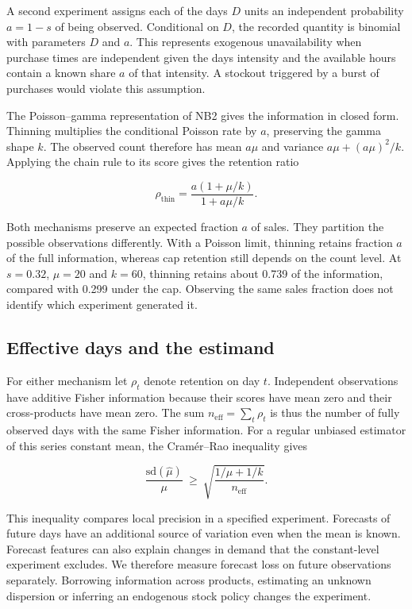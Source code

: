 \documentclass[11pt,a4paper]{article}
\begin{document}
A second experiment assigns each of the day\textquotesingle s \(D\) units an independent probability \(a=1-s\) of being observed. Conditional on \(D\), the recorded quantity is binomial with parameters \(D\) and \(a\). This represents exogenous unavailability when purchase times are independent given the day\textquotesingle s intensity and the available hours contain a known share \(a\) of that intensity. A stockout triggered by a burst of purchases would violate this assumption.

The Poisson--gamma representation of NB2 gives the information in closed form. Thinning multiplies the conditional Poisson rate by \(a\), preserving the gamma shape \(k\). The observed count therefore has mean \(a\mu\) and variance \(a\mu+(a\mu)^2/k\). Applying the chain rule to its score gives the retention ratio

\[
\rho_{\mathrm{thin}}=\frac{a(1+\mu/k)}{1+a\mu/k}.
\]

Both mechanisms preserve an expected fraction \(a\) of sales. They partition the possible observations differently. With a Poisson limit, thinning retains fraction \(a\) of the full information, whereas cap retention still depends on the count level. At \(s=0.32\), \(\mu=20\) and \(k=60\), thinning retains about 0.739 of the information, compared with 0.299 under the cap. Observing the same sales fraction does not identify which experiment generated it.

\subsection{Effective days and the estimand}

For either mechanism let \(\rho_t\) denote retention on day \(t\). Independent observations have additive Fisher information because their scores have mean zero and their cross-products have mean zero. The sum \(n_{\mathrm{eff}}=\sum_t\rho_t\) is thus the number of fully observed days with the same Fisher information. For a regular unbiased estimator of this series\textquotesingle{} constant mean, the Cram\'er--Rao inequality \cite{ref6} gives

\[
\frac{\mathrm{sd}(\widehat\mu)}{\mu}\ \ge\
\sqrt{\frac{1/\mu+1/k}{n_{\mathrm{eff}}}}.
\]

This inequality compares local precision in a specified experiment. Forecasts of future days have an additional source of variation even when the mean is known. Forecast features can also explain changes in demand that the constant-level experiment excludes. We therefore measure forecast loss on future observations separately. Borrowing information across products, estimating an unknown dispersion or inferring an endogenous stock policy changes the experiment.
\end{document}
